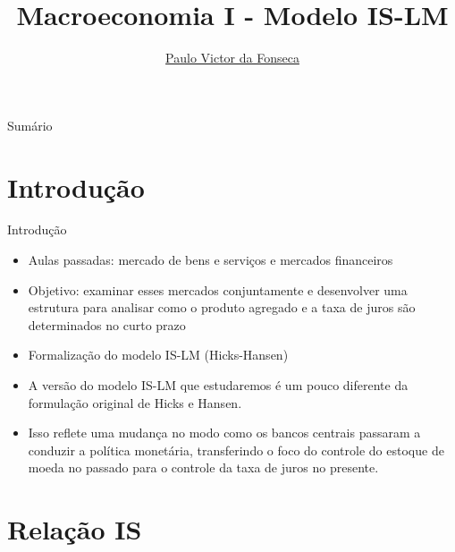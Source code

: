\documentclass[10pt]{beamer}
\title[]{Macroeconomia I - Modelo IS-LM}
\author[]{\href{https://pvfonseca.github.io}{Paulo Victor da Fonseca}}
\date{}
\begin{document}
\begin{frame}[plain]
\end{frame}

\begin{frame}{Sumário}
    \tableofcontents
\end{frame}

\section{Introdução}
\begin{frame}{Introdução}
    \begin{itemize}
        \item Aulas passadas: mercado de bens e serviços e mercados financeiros
        \bigskip
        \item Objetivo: examinar esses mercados conjuntamente e desenvolver uma estrutura para analisar como o produto agregado e a taxa de juros são determinados no curto prazo
        \bigskip
        \item Formalização do modelo IS-LM (Hicks-Hansen)
        \bigskip
        \item A versão do modelo IS-LM que estudaremos é um pouco diferente da formulação original de Hicks e Hansen.
        \bigskip
        \item Isso reflete uma mudança no modo como os bancos centrais passaram a conduzir a política monetária, transferindo o foco do controle do estoque de moeda no passado para o controle da taxa de juros no presente.
    \end{itemize}
\end{frame}

\section{Relação IS}
\end{document}
